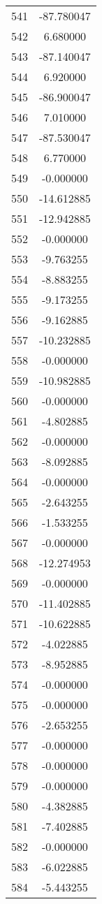 \documentclass[12pt]{article}
\begin{document}
\begin{longtable}{@{}cc@{}}
541 & -87.780047 \\
542 & 6.680000 \\
543 & -87.140047 \\
544 & 6.920000 \\
545 & -86.900047 \\
546 & 7.010000 \\
547 & -87.530047 \\
548 & 6.770000 \\
549 & -0.000000 \\
550 & -14.612885 \\
551 & -12.942885 \\
552 & -0.000000 \\
553 & -9.763255 \\
554 & -8.883255 \\
555 & -9.173255 \\
556 & -9.162885 \\
557 & -10.232885 \\
558 & -0.000000 \\
559 & -10.982885 \\
560 & -0.000000 \\
561 & -4.802885 \\
562 & -0.000000 \\
563 & -8.092885 \\
564 & -0.000000 \\
565 & -2.643255 \\
566 & -1.533255 \\
567 & -0.000000 \\
568 & -12.274953 \\
569 & -0.000000 \\
570 & -11.402885 \\
571 & -10.622885 \\
572 & -4.022885 \\
573 & -8.952885 \\
574 & -0.000000 \\
575 & -0.000000 \\
576 & -2.653255 \\
577 & -0.000000 \\
578 & -0.000000 \\
579 & -0.000000 \\
580 & -4.382885 \\
581 & -7.402885 \\
582 & -0.000000 \\
583 & -6.022885 \\
584 & -5.443255 \\

\end{longtable}
\end{document}

